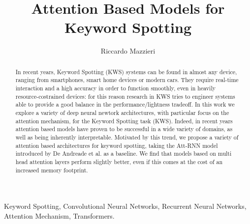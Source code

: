 \documentclass[10pt, conference, letterpaper]{IEEEtran}
\title{Attention Based Models for Keyword Spotting\\}
\author{Riccardo Mazzieri
}
\newcommand\MR[1]{\textcolor{blue}{#1}}
\begin{document}
\maketitle

\begin{abstract}
In recent years, Keyword Spotting (KWS) systems can be found in almost any device, ranging from smartphones, smart home devices or modern cars. They require real-time interaction and a high accuracy in order to function smoothly, even in heavily resource-costrained devices: for this reason research in KWS tries to engineer systems able to provide a good balance in the performance/lightness tradeoff.
In this work we explore a variety of deep neural newtork architectures, with particular focus on the attention mechanism, for the Keyword Spotting task (KWS). Indeed, in recent years attention based models have proven to be successful in a wide variety of domains, as well as being inherently interpretable. Motivated by this trend, we propose a variety of attention based architectures for keyword spotting, taking the Att-RNN model introduced by De Andreade et al. \cite{attention2018andreade} as a baseline. We find that models based on multi head attention layers perform slightly better, even if this comes at the cost of an increased memory footprint. 
\end{abstract}

\IEEEkeywords
Keyword Spotting, Convolutional Neural Networks, Recurrent Neural Networks, Attention Mechanism, Transformers. 
\endIEEEkeywords














\end{document}
